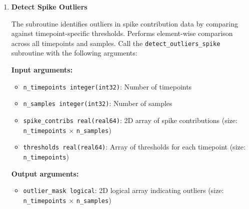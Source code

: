\begin{enumerate}
\begin{enumerate}
\begin{enumerate}
\begin{itemize}
                            \item \texttt{ierr integer(int32)}: Error code (for error
                                  details please check
                                  \hyperref[sec:error-handling]{error handling section})
                          \end{itemize}
                          \begin{lstlisting}[language=Fortran, caption={Spike Thresholds Calculation}]
call calc_spike_thresholds(spike_contribs, n_timepoints, &
                        n_samples, percentile_val, thresholds, & 
                        permutation, ierr)
                          \end{lstlisting}
                          
                    \item \textbf{Detect Spike Outliers}
                          
                          The subroutine identifies outliers in spike contribution data by comparing
                          against timepoint-specific thresholds. Performs element-wise
                          comparison across all timepoints and samples. Call the \texttt{detect\_outliers\_spike}
                          subroutine with the following arguments:
                          
                          \textbf{Input arguments:}
                          \begin{itemize}
                            \item \texttt{n\_timepoints integer(int32)}: Number of timepoints
                                  
                            \item \texttt{n\_samples integer(int32)}: Number of samples
                                  
                            \item \texttt{spike\_contribs real(real64)}: 2D array of spike contributions
                                  (size: \texttt{n\_timepoints} × \texttt{n\_samples})
                                  
                            \item \texttt{thresholds real(real64)}: Array of thresholds for each
                                  timepoint (size: \texttt{n\_timepoints})
                          \end{itemize}
                          \textbf{Output arguments:}
                          \begin{itemize}
                            \item \texttt{outlier\_mask logical}: 2D logical array indicating
                                  outliers (size: \texttt{n\_timepoints} × \texttt{n\_samples})
                                  

\end{itemize}
\end{enumerate}
\end{enumerate}
\end{enumerate}
